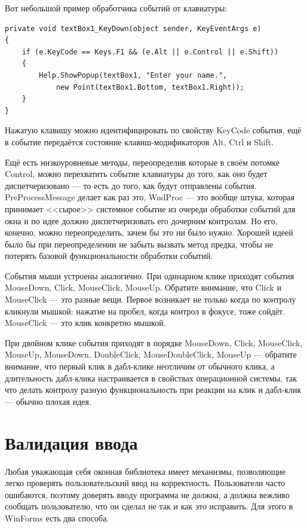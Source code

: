 \documentclass{../../text-style}
\begin{document}
Вот небольшой пример обработчика событий от клавиатуры: 

\begin{verbatim}
private void textBox1_KeyDown(object sender, KeyEventArgs e)
{
    if (e.KeyCode == Keys.F1 && (e.Alt || e.Control || e.Shift))
    {
        Help.ShowPopup(textBox1, "Enter your name.", 
            new Point(textBox1.Bottom, textBox1.Right));
    }
}
\end{verbatim}

Нажатую клавишу можно идентифицировать по свойству KeyCode события, ещё в событие передаётся состояние клавиш-модификаторов Alt, Ctrl и Shift. 

Ещё есть низкоуровневые методы, переопределив которые в своём потомке Control, можно перехватить событие клавиатуры до того, как оно будет диспетчеризовано --- то есть до того, как будут отправлены события. PreProcessMessage делает как раз это, WndProc --- это вообще штука, которая принимает <<сырое>> системное событие из очереди обработки событий для окна и по идее должно диспетчеризовать его дочерним контролам. Но его, конечно, можно переопределить, зачем бы это ни было нужно. Хорошей идеей было бы при переопределении не забыть вызвать метод предка, чтобы не потерять базовой функциональности обработки событий.

События мыши устроены аналогично. При одинарном клике приходят события MouseDown, Click, MouseClick, MouseUp. Обратите внимание, что Click и MouseClick --- это разные вещи. Первое возникает не только когда по контролу кликнули мышкой: нажатие на пробел, когда контрол в фокусе, тоже сойдёт. MouseClick --- это клик конкретно мышкой.

При двойном клике события приходят в порядке MouseDown, Click, MouseClick, MouseUp, MouseDown, DoubleClick, MouseDoubleClick, MouseUp --- обратите внимание, что первый клик в дабл-клике неотличим от обычного клика, а длительность дабл-клика настраивается в свойствах операционной системы, так что делать контролу разную функциональность при реакции на клик и дабл-клик --- обычно плохая идея.

\section{Валидация ввода}

Любая уважающая себя оконная библиотека имеет механизмы, позволяющие легко проверять пользовательский ввод на корректность. Пользователи часто ошибаются, поэтому доверять вводу программа не должна, а должна вежливо сообщать пользователю, что он сделал не так и как это исправить. Для этого в WinForms есть два способа. 
\end{document}
